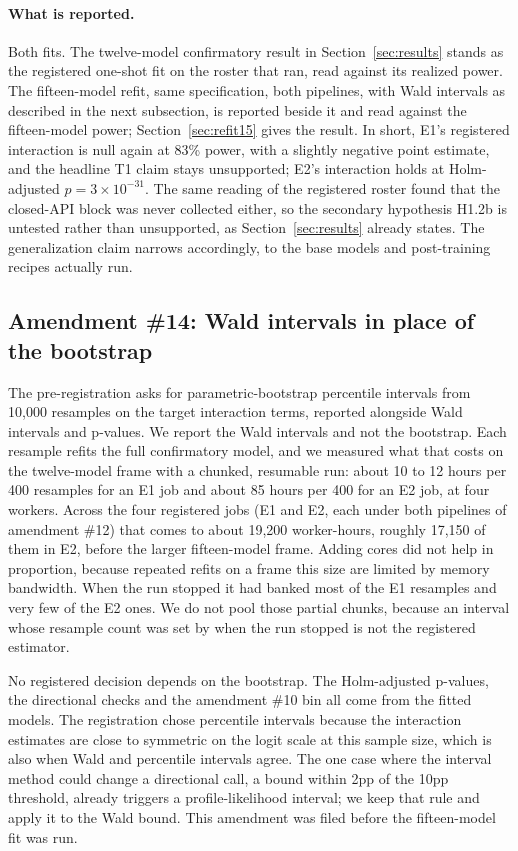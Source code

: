 \paragraph{What is reported.}
Both fits. The twelve-model confirmatory result in Section~\ref{sec:results}
stands as the registered one-shot fit on the roster that ran, read against its
realized power. The fifteen-model refit, same specification, both pipelines,
with Wald intervals as described in the next subsection, is reported beside it
and read against the fifteen-model power; Section~\ref{sec:refit15} gives the
result. In short, E1's registered interaction is null again at 83\% power, with
a slightly negative point estimate, and the headline T1 claim stays unsupported;
E2's interaction holds at Holm-adjusted $p = 3 \times 10^{-31}$. The same reading of the registered roster found that
the closed-API block was never collected either, so the secondary hypothesis
H1.2b is untested rather than unsupported, as Section~\ref{sec:results}
already states. The generalization claim narrows accordingly, to the base
models and post-training recipes actually run.

\subsection{Amendment \#14: Wald intervals in place of the bootstrap}

The pre-registration asks for parametric-bootstrap percentile intervals from
10,000 resamples on the target interaction terms, reported alongside Wald
intervals and p-values. We report the Wald intervals and not the bootstrap. Each
resample refits the full confirmatory model, and we measured what that costs on
the twelve-model frame with a chunked, resumable run: about 10 to 12 hours per
400 resamples for an E1 job and about 85 hours per 400 for an E2 job, at four
workers. Across the four registered jobs (E1 and E2, each under both pipelines
of amendment \#12) that comes to about 19,200 worker-hours, roughly 17,150 of
them in E2, before the larger fifteen-model frame. Adding cores did not help in
proportion, because repeated refits on a frame this size are limited by memory
bandwidth. When the run stopped it had banked most of the E1 resamples and very
few of the E2 ones. We do not pool those partial chunks, because an interval
whose resample count was set by when the run stopped is not the registered
estimator.

No registered decision depends on the bootstrap. The Holm-adjusted p-values,
the directional checks and the amendment \#10 bin all come from the fitted
models. The registration chose percentile intervals because the interaction
estimates are close to symmetric on the logit scale at this sample size, which
is also when Wald and percentile intervals agree. The one case where the
interval method could change a directional call, a bound within 2pp of the
10pp threshold, already triggers a profile-likelihood interval; we keep that
rule and apply it to the Wald bound. This amendment was filed before the
fifteen-model fit was run.

